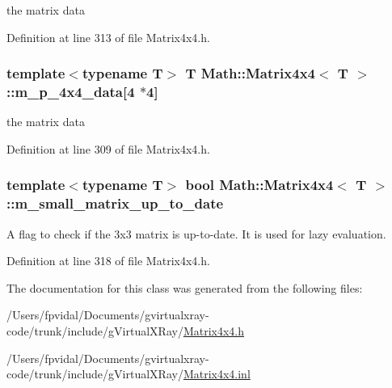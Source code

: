the matrix data 



Definition at line 313 of file Matrix4x4.h.

\hypertarget{class_math_1_1_matrix4x4_a71124664bc0abb8d04c60f9d5aa3b223}{
\subsubsection[{m\_\-p\_\-4x4\_\-data}]{\setlength{\rightskip}{0pt plus 5cm}template$<$typename T$>$ T {\bf Math::Matrix4x4}$<$ T $>$::{\bf m\_\-p\_\-4x4\_\-data}\mbox{[}4 $\ast$4\mbox{]}}}
\label{class_math_1_1_matrix4x4_a71124664bc0abb8d04c60f9d5aa3b223}


the matrix data 



Definition at line 309 of file Matrix4x4.h.

\hypertarget{class_math_1_1_matrix4x4_ab2beab6050bc7e8a170b7f2121aeefb5}{
\subsubsection[{m\_\-small\_\-matrix\_\-up\_\-to\_\-date}]{\setlength{\rightskip}{0pt plus 5cm}template$<$typename T$>$ bool {\bf Math::Matrix4x4}$<$ T $>$::{\bf m\_\-small\_\-matrix\_\-up\_\-to\_\-date}}}
\label{class_math_1_1_matrix4x4_ab2beab6050bc7e8a170b7f2121aeefb5}
A flag to check if the 3x3 matrix is up-\/to-\/date. It is used for lazy evaluation. 

Definition at line 318 of file Matrix4x4.h.



The documentation for this class was generated from the following files:\begin{DoxyCompactItemize}
\item 
/Users/fpvidal/Documents/gvirtualxray-\/code/trunk/include/gVirtualXRay/\hyperlink{_matrix4x4_8h}{Matrix4x4.h}\item 
/Users/fpvidal/Documents/gvirtualxray-\/code/trunk/include/gVirtualXRay/\hyperlink{_matrix4x4_8inl}{Matrix4x4.inl}\end{DoxyCompactItemize}
